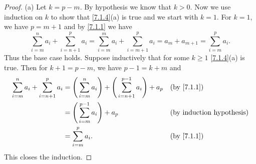 \begin{proof}{(a)}
  Let \(k = p - m\).
  By hypothesis we know that \(k > 0\).
  Now we use induction on \(k\) to show that \cref{7.1.4}(a) is true and we start with \(k = 1\).
  For \(k = 1\), we have \(p = m + 1\) and by \cref{7.1.1} we have
  \[
    \sum_{i = m}^n a_i + \sum_{i = n + 1}^p a_i = \sum_{i = m}^m a_i + \sum_{i = m + 1}^p a_i = a_m + a_{m + 1} = \sum_{i = m}^p a_i.
  \]
  Thus the base case holds.
  Suppose inductively that for some \(k \geq 1\) \cref{7.1.4}(a) is true.
  Then for \(k + 1 = p - m\), we have \(p - 1 = k + m\) and
  \begin{align*}
    \sum_{i = m}^n a_i + \sum_{i = n + 1}^p a_i & = \Bigg(\sum_{i = m}^n a_i\Bigg) + \Bigg(\sum_{i = n + 1}^{p - 1} a_i\Bigg) + a_p &  & \by{7.1.1} \\
                                                & = \Bigg(\sum_{i = m}^{p - 1} a_i\Bigg) + a_p                                      &  & \byIH      \\
                                                & = \sum_{i = m}^p a_i.                                                             &  & \by{7.1.1}
  \end{align*}
  This closes the induction.
\end{proof}

